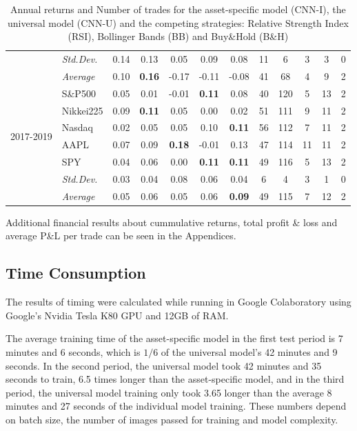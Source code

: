 \documentclass[11pt, a4paper]{article}
\begin{document}
\begin{table}[H]
\begin{tabular}{l|l|ccccc|ccccc}
 & \textit{Std.Dev.} & 0.14 & 0.13 & 0.05  & 0.09  & 0.08  & 11 & 6  & 3 & 3  & 0 \\ \cline{2-12} 
 & \textit{Average}  & 0.10 & \textbf{0.16} & -0.17 & -0.11 & -0.08 & 41 & 68 & 4 & 9  & 2 \\ \hline
\multirow{6}{1cm}{2017-2019} & S\&P500       & 0.05          & 0.01          & -0.01         & \textbf{0.11} & 0.08          & 40               & 120   & 5   & 13 & 2    \\
  & Nikkei225     & 0.09          & \textbf{0.11} & 0.05          & 0.00          & 0.02          & 51               & 111   & 9   & 11 & 2    \\
  & Nasdaq         & 0.02          & 0.05          & 0.05          & 0.10          & \textbf{0.11} & 56               & 112   & 7   & 11 & 2    \\
  & AAPL      & 0.07          & 0.09          & \textbf{0.18} & -0.01         & 0.13          & 47               & 114   & 11  & 11 & 2    \\
  & SPY       & 0.04          & 0.06          & 0.00          & \textbf{0.11} & \textbf{0.11} & 49               & 116   & 5   & 13 & 2    \\ 
  \cline{2-12}
  & \textit{Std.Dev.}  & 0.03 & 0.04 & 0.08 & 0.06 & 0.04 & 6 & 4 & 3 & 1 & 0\\
  \cline{2-12}
  & \textit{Average} & 0.05          & 0.06          & 0.05          & 0.06          & \textbf{0.09} & 49               & 115   & 7   & 12 & 2   
\end{tabular}
\caption{Annual returns and Number of trades for the asset-specific model (CNN-I), the universal model (CNN-U) and the competing strategies: Relative Strength Index (RSI), Bollinger Bands (BB) and Buy\&Hold (B\&H)}
\label{tbl:FinResMain}
\end{table}

Additional financial results about cummulative returns, total profit \& loss and average P\&L per trade can be seen in the Appendices.

\subsection{Time Consumption}
\label{subsec:ER:TimePerf}

The results of timing were calculated while running in Google Colaboratory using Google's Nvidia Tesla K80 GPU and 12GB of RAM.

The average training time of the asset-specific model in the first test period is 7 minutes and 6 seconds, which is $1/6$ of the universal model's 42 minutes and 9 seconds. 
In the second period, the universal model took 42 minutes and 35 seconds to train, 6.5 times longer than the asset-specific model, and in the third period, the universal model training only took 3.65 longer than the average 8 minutes and 27 seconds of the individual model training. These numbers depend on batch size, the number of images passed for training and model complexity.
\end{document}
